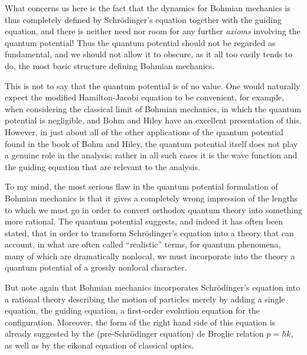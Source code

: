 What concerns us here is the fact that the dynamics for Bohmian mechanics
is thus completely defined by Schr\"odinger's equation together with the
guiding equation, and there is neither need nor room for any further {\it
axioms\/} involving the quantum potential! Thus the quantum potential
should not be regarded as fundamental, and we should not allow it to
obscure, as it all too easily tends to do, the most basic structure
defining Bohmian mechanics.

This is not to say that the quantum potential is of no value. One would
naturally expect the modified Hamilton-Jacobi equation to be convenient,
for example, when considering the classical limit of Bohmian mechanics, in
which the quantum potential is negligible, and Bohm and Hiley have an
excellent presentation of this.  However, in just about all of the other
applications of the quantum potential found in the book of Bohm and Hiley,
the quantum potential itself does not play a genuine role in the analysis;
rather in all such cases it is the wave function and the guiding equation
that are relevant to the analysis.

To my mind, the most serious flaw in the quantum potential formulation of
Bohmian mechanics is that it gives a completely wrong impression of the
lengths to which we must go in order to convert orthodox quantum theory
into something more rational. The quantum potential suggests, and indeed it
has often been stated, that in order to transform Schr\"odinger's equation
into a theory that can account, in what are often called ``realistic''
terms, for quantum phenomena, many of which are dramatically nonlocal, we
must incorporate into the theory a quantum potential of a grossly nonlocal
character.

But note again that Bohmian mechanics incorporates Schr\"odinger's equation
into a rational theory describing the motion of particles merely by adding
a single equation, the guiding equation, a first-order evolution equation
for the configuration. Moreover, the form of the right hand side of this
equation is already suggested by the (pre-Schr\"odinger equation) de
Broglie relation $p=\hbar k$, as well as by the eikonal equation of
classical optics.

